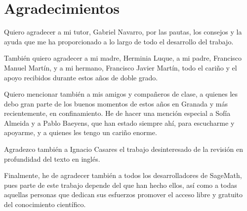 
\begingroup
\let\clearpage\relax
\let\cleardoublepage\relax
\let\cleardoublepage\relax
\chapter*{Agradecimientos}
Quiero agradecer a mi tutor, Gabriel Navarro, por las pautas, los consejos y la ayuda que me ha proporcionado a lo largo de todo el desarrollo del trabajo.

También quiero agradecer a mi madre, Herminia Luque, a mi padre, Francisco Manuel Martín, y a mi hermano, Francisco Javier Martín, todo el cariño y el apoyo recibidos durante estos años de doble grado.

Quiero mencionar también a mis amigos y compañeros de clase, a quienes les debo gran parte de los buenos momentos de estos años en Granada y más recientemente, en confinamiento.
He de hacer una mención especial a Sofía Almeida y a Pablo Baeyens, que han estado siempre ahí, para escucharme y apoyarme, y a quienes les tengo un cariño enorme.

Agradezco también a Ignacio Casares el trabajo desinteresado de la revisión en profundidad del texto en inglés.

Finalmente, he de agradecer también a todos los desarrolladores de SageMath, pues parte de este trabajo depende del que han hecho ellos, así como a todas aquellas personas que dedican sus esfuerzos promover el acceso libre y gratuito del conocimiento científico.



\endgroup